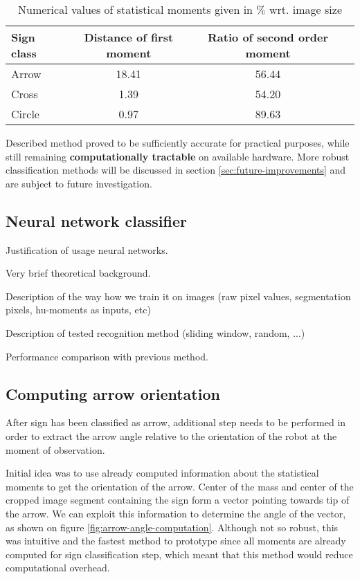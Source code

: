 \begin{table}[th!]
\centering
\begin{tabular}{l*{2}{c}r}
	Sign class			& Distance of first moment & Ratio of second order moment  \\
	\hline
	Arrow 				& 18.41 & 56.44  \\
	Cross            	& 1.39 & 54.20  \\
	Circle           	& 0.97 & 89.63  \\
\end{tabular}
\caption{Numerical values of statistical moments given in $\%$ wrt. image size}
\label{tab:moments}
\end{table}

Described method proved to be sufficiently accurate for practical purposes, while still remaining \textbf{computationally tractable} on available hardware. More robust classification methods will be discussed in section \ref{sec:future-improvements} and are subject to future investigation.

\subsection{Neural network classifier}

Justification of usage neural networks.

Very brief theoretical background.

Description of the way how we train it on images (raw pixel values, segmentation pixels, hu-moments as inputs, etc)

Description of tested recognition method (sliding window, random, ...)

Performance comparison with previous method.

\subsection{Computing arrow orientation}

After sign has been classified as arrow, additional step needs to be performed in order to extract the arrow angle relative to the orientation of the robot at the moment of observation.

Initial idea was to use already computed information about the statistical moments to get the orientation of the arrow. Center of the mass and center of the cropped image segment containing the sign form a vector pointing towards tip of the arrow. We can exploit this information to determine the angle of the vector, as shown on figure \ref{fig:arrow-angle-computation}. Although not so robust, this was intuitive and the fastest method to prototype since all moments are already computed for sign classification step, which meant that this method would reduce computational overhead.

